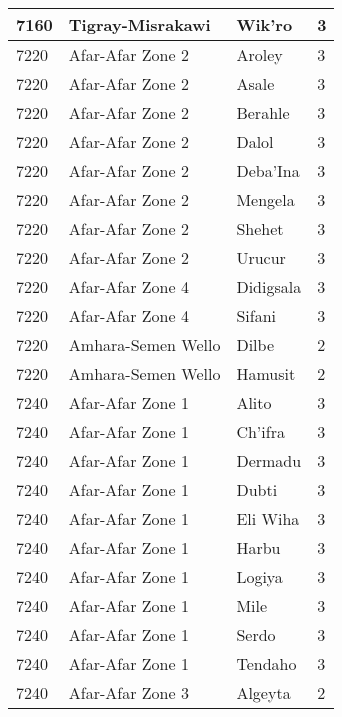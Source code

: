 \documentclass[12pt,a4paper,openbib,titlepage]{report}
\begin{document}
\begin{longtable}{|p{2cm}|p{6.5cm}|p{8cm}|p{1.5cm}|}
\hline 
\rule[-1ex]{0pt}{2.5ex} 7160 & Tigray-Misrakawi & Wik'ro & 3 \\
\hline 
\rule[-1ex]{0pt}{2.5ex} 7220 & Afar-Afar Zone 2 & Aroley & 3 \\
\hline 
\rule[-1ex]{0pt}{2.5ex} 7220 & Afar-Afar Zone 2 & Asale & 3 \\
\hline 
\rule[-1ex]{0pt}{2.5ex} 7220 & Afar-Afar Zone 2 & Berahle & 3 \\
\hline 
\rule[-1ex]{0pt}{2.5ex} 7220 & Afar-Afar Zone 2 & Dalol & 3 \\
\hline 
\rule[-1ex]{0pt}{2.5ex} 7220 & Afar-Afar Zone 2 & Deba'Ina & 3 \\
\hline 
\rule[-1ex]{0pt}{2.5ex} 7220 & Afar-Afar Zone 2 & Mengela & 3 \\
\hline 
\rule[-1ex]{0pt}{2.5ex} 7220 & Afar-Afar Zone 2 & Shehet & 3 \\
\hline 
\rule[-1ex]{0pt}{2.5ex} 7220 & Afar-Afar Zone 2 & Urucur & 3 \\
\hline 
\rule[-1ex]{0pt}{2.5ex} 7220 & Afar-Afar Zone 4 & Didigsala & 3 \\
\hline 
\rule[-1ex]{0pt}{2.5ex} 7220 & Afar-Afar Zone 4 & Sifani & 3 \\
\hline 
\rule[-1ex]{0pt}{2.5ex} 7220 & Amhara-Semen Wello & Dilbe & 2 \\
\hline 
\rule[-1ex]{0pt}{2.5ex} 7220 & Amhara-Semen Wello & Hamusit & 2 \\
\hline 
\rule[-1ex]{0pt}{2.5ex} 7240 & Afar-Afar Zone 1 & Alito & 3 \\
\hline 
\rule[-1ex]{0pt}{2.5ex} 7240 & Afar-Afar Zone 1 & Ch'ifra & 3 \\
\hline 
\rule[-1ex]{0pt}{2.5ex} 7240 & Afar-Afar Zone 1 & Dermadu & 3 \\
\hline 
\rule[-1ex]{0pt}{2.5ex} 7240 & Afar-Afar Zone 1 & Dubti & 3 \\
\hline 
\rule[-1ex]{0pt}{2.5ex} 7240 & Afar-Afar Zone 1 & Eli Wiha & 3 \\
\hline 
\rule[-1ex]{0pt}{2.5ex} 7240 & Afar-Afar Zone 1 & Harbu & 3 \\
\hline 
\rule[-1ex]{0pt}{2.5ex} 7240 & Afar-Afar Zone 1 & Logiya & 3 \\
\hline 
\rule[-1ex]{0pt}{2.5ex} 7240 & Afar-Afar Zone 1 & Mile & 3 \\
\hline 
\rule[-1ex]{0pt}{2.5ex} 7240 & Afar-Afar Zone 1 & Serdo & 3 \\
\hline 
\rule[-1ex]{0pt}{2.5ex} 7240 & Afar-Afar Zone 1 & Tendaho & 3 \\
\hline 
\rule[-1ex]{0pt}{2.5ex} 7240 & Afar-Afar Zone 3 & Algeyta & 2 \\

\end{longtable}
\end{document}
